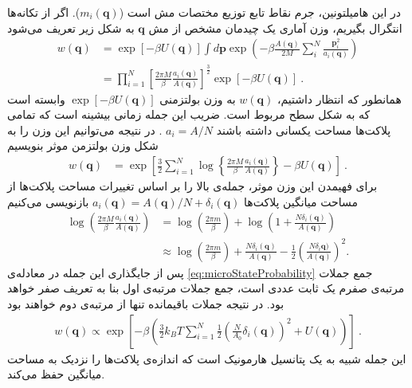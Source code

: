 در این هامیلتونین، جرم نقاط تابع توزیع مختصات مش است
($m_i(\bm q)$).
 اگر از تکانه‌ها انتگرال بگیریم، وزن آماری یک چیدمان مشخص از مش
$\bm q$
به شکل زیر تعریف می‌شود
\begin{equation}
\begin{aligned}
w(\bm q)&=\exp\left[-\beta U(\bm q)\right]\int d\bm p\exp\left(-\beta\frac {A(\bm q)}{2M}  \sum_i^N \frac{\bm p_i^2}{a_i(\bm q)}\right)\\
&=\prod_{i=1}^N\left[\frac{2\pi M}{\beta} \frac{a_i(\bm q)}{A(\bm q)}\right]^{\frac{3}{2}}\exp\left[-\beta U(\bm q)\right]\ .
\end{aligned}
\label{eq:microStateProbability1}
\end{equation}
همانطور که انتظار داشتیم،
$w(\bm q)$ 
به وزن بولتزمنی 
$\exp\left[-\beta U(\bm q)\right]$
وابسته است که به شکل سطح مربوط است. ضریب این جمله زمانی بیشینه است که تمامی پلاکت‌ها مساحت یکسانی داشته باشند
$a_i = A/N$
. در نتیجه می‌توانیم این وزن را به شکل وزن بولتزمن موثر بنویسیم
\begin{equation}
\begin{aligned}
w(\bm q)
&=\exp\left[\frac{3}{2}\sum_{i=1}^N\log\left\{\frac{2\pi M}{\beta} \frac{a_i(\bm q)}{A(\bm q)}\right\}-\beta U(\bm q)\right]\ .
\end{aligned}
\label{eq:microStateProbability}
\end{equation}
برای فهیمدن این وزن موثر، جمله‌ی بالا را بر اساس تغییرات مساحت پلاکت‌ها از مساحت میانگین پلاکت‌ها 
$a_i(\bm q)=A(\bm q)/N+\delta_i(\bm q)$
بازنویسی می‌کنیم
\begin{equation*}
\begin{aligned}
\log\left(\frac{2\pi M}{\beta} \frac{a_i(\bm q)}{A(\bm q)}\right)
&=\log\left(\frac{2\pi m}{\beta}\right)+\log\left(1+\frac{N\delta_i(\bm q)}{A(\bm q)}\right)\\
&\approx\log\left(\frac{2\pi m}{\beta}\right)+\frac{N\delta_i(\bm q)}{A(\bm q)}-\frac{1}{2}\left(\frac{N\delta_i\bm q)}{A(\bm q)}\right)^2.
\end{aligned}
\label{eq:logExpantion}
\end{equation*}
پس از جایگذاری این جمله در معادله‌ی 
\ref{eq:microStateProbability}
جمع جملات مرتبه‌ی صفرم یک ثابت عددی است، جمع جملات مرتبه‌ی اول بنا به تعریف صفر خواهد بود. در نتیجه جملات باقیمانده تنها از مرتبه‌ی دوم خواهند بود
\begin{equation}
\begin{aligned}
w(\bm q)\propto\exp\left[-\beta\left( \frac{3}{2}k_BT\sum_{i=1}^N \frac{1}{2}(\frac{N}{A_0}\delta_i(\bm q))^2+U(\bm q)\right)\right] \ .
\end{aligned}
\label{eq:microStateProbabilityExpansion}
\end{equation}
این جمله شبیه به یک پتانسیل هارمونیک است که اندازه‌ی پلاکت‌ها را نزدیک به مساحت میانگین حفظ می‌کند.



